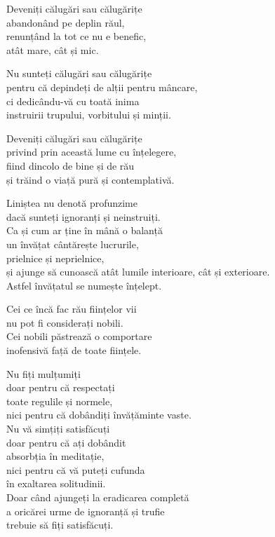 Deveniți călugări sau călugărițe\\
abandonând pe deplin răul,\\
renunțând la tot ce nu e benefic,\\
atât mare, cât și mic.


Nu sunteți călugări sau călugărițe\\
pentru că depindeți de alții pentru mâncare,\\
ci dedicându-vă cu toată inima\\
instruirii trupului, vorbitului și minții.


Deveniți călugări sau călugărițe\\
privind prin această lume cu înțelegere,\\
fiind dincolo de bine și de rău\\
și trăind o viață pură și contemplativă.


Liniștea nu denotă profunzime\\
dacă sunteți ignoranți și neinstruiți.\\
Ca și cum ar ține în mână o balanță\\
un învățat cântărește lucrurile,\\
prielnice și neprielnice,\\
și ajunge să cunoască atât lumile interioare, cât și exterioare.\\
Astfel învățatul se numește înțelept.


Cei ce încă fac rău ființelor vii\\
nu pot fi considerați nobili.\\
Cei nobili păstrează o comportare\\
inofensivă față de toate ființele.


Nu fiți mulțumiți\\
doar pentru că respectați\\
toate regulile și normele,\\
nici pentru că dobândiți învățăminte vaste.\\
Nu vă simțiți satisfăcuți\\
doar pentru că ați dobândit\\
absorbția în meditație,\\
nici pentru că vă puteți cufunda\\
în exaltarea solitudinii.\\
Doar când ajungeți la eradicarea completă\\
a oricărei urme de ignoranță și trufie\\
trebuie să fiți satisfăcuți.
